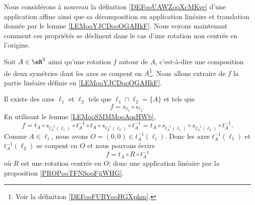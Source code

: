Nous considérons à nouveau la définition \ref{DEFooUAWZooXcMKve} d'une application affine ainsi que sa décomposition en application linéaire et translation donnée par le lemme \ref{LEMooYJCDooOGAHkF}. Nous voyons maintenant comment ces propriétés se déclinent dans le cas d'une rotation non centrée en l'origine.

\begin{example}
	Soit \( A\in \eR^2\) ainsi qu'une rotation \( f\) autour de \( A\), c'est-à-dire une composition de deux symétries dont les axes se coupent en \( A\)\footnote{Voir la définition \ref{DEFooFUBYooHGXphm}.}. Nous allons extraire de \( f\) la partie linéaire définie en \ref{LEMooYJCDooOGAHkF}.

	Il existe des axes \( \ell_1\) et \( \ell_2\) tels que \( \ell_1\cap\ell_2=\{ A \}\) et tels que
	\begin{equation}
		f=s_{\ell_1}\circ s_{\ell_2}.
	\end{equation}
	En utilisant le lemme \ref{LEMooSMMMooAqsHWb},
	\begin{equation}
		f=t_A\circ s_{t^{-1}_A(\ell_1)}\circ t_A^{-1}\circ t_A\circ s_{t_A^{-1}(\ell_2)}\circ t_A^{-1}=t_A\circ s_{t^{-1}_A(\ell_1)}\circ s_{t_A^{-1}(\ell_2)}\circ t_A^{-1}.
	\end{equation}
	Comme \( A\in\ell_i\), nous avons \( O=(0,0)\in t_A^{-1}(\ell_i)\). Donc les axes \( t_A^{-1}(\ell_1)\) et \( t_A^{-1}(\ell_2)\) se coupent en \( O\) et nous pouvons écrire
	\begin{equation}        %
		f=t_A\circ R\circ t_A^{-1}
	\end{equation}
	où \( R\) est une rotation centrée en \( O\); donc une application linéaire par la proposition \ref{PROPooTFNSooFjiWHG}.


\end{example}
